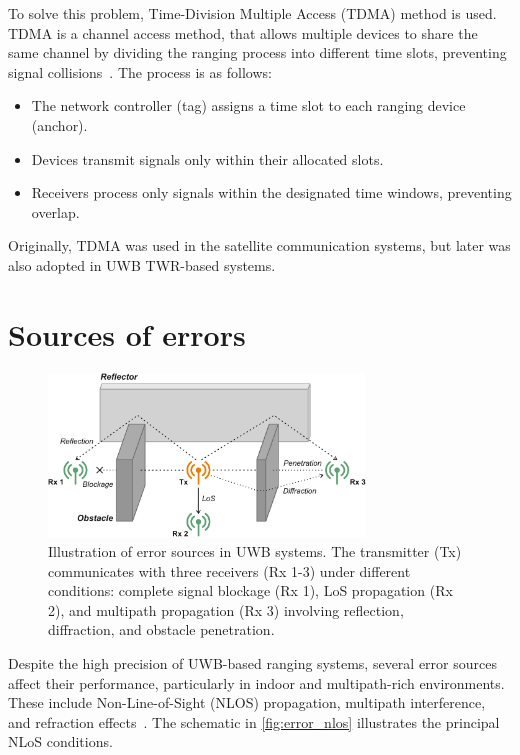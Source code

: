 To solve this problem, Time-Division Multiple Access (TDMA) method is used. TDMA is a channel access method, that allows multiple devices to share the same channel by dividing the ranging process into different time slots, preventing signal collisions~\cite{falconer1995time}. The process is as follows:

\begin{itemize}
    \item The network controller (tag) assigns a time slot to each ranging device (anchor).
    \item Devices transmit signals only within their allocated slots.
    \item Receivers process only signals within the designated time windows, preventing overlap.
\end{itemize}

Originally, TDMA was used in the satellite communication systems, but later was also adopted in UWB TWR-based systems. 


\section{Sources of errors}\label{error_sources}

\begin{figure}[tbh]
\includegraphics[width=0.75\textwidth]{Graphics/obstacles.pdf}
\centering
\caption[Illustration of error sources in UWB systems.]{Illustration of error sources in UWB systems. The transmitter (Tx) communicates with three receivers (Rx 1-3) under different conditions: complete signal blockage (Rx 1), LoS propagation (Rx 2), and multipath propagation (Rx 3) involving reflection, diffraction, and obstacle penetration.}
\label{fig:error_nlos}
\end{figure}

Despite the high precision of UWB-based ranging systems, several error sources affect their performance, particularly in indoor and multipath-rich environments. These include Non-Line-of-Sight (NLOS) propagation, multipath interference, and refraction effects~\cite{dardari2009ranging}. The schematic in \autoref{fig:error_nlos} illustrates the principal NLoS conditions.

